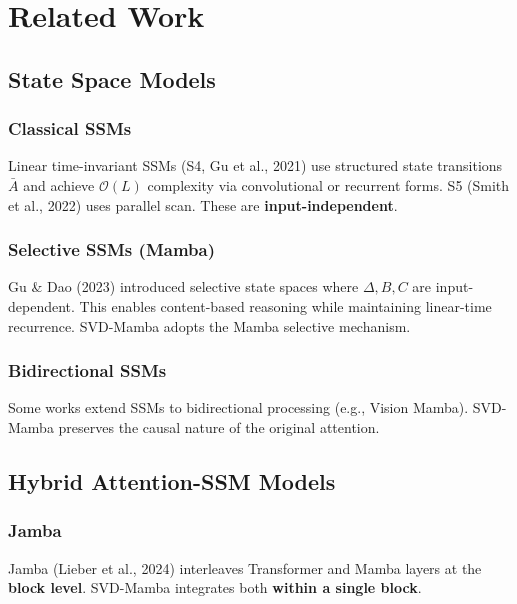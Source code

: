 
\section{Related Work}

\subsection{State Space Models}

\subsubsection{Classical SSMs}

Linear time-invariant SSMs (S4, Gu et al., 2021) use structured state 
transitions $\bar{A}$ and achieve $\mathcal{O}(L)$ complexity via 
convolutional or recurrent forms. S5 (Smith et al., 2022) uses parallel 
scan. These are \textbf{input-independent}.

\subsubsection{Selective SSMs (Mamba)}

Gu \& Dao (2023) introduced selective state spaces where $\Delta, B, C$ 
are input-dependent. This enables content-based reasoning while maintaining 
linear-time recurrence. SVD-Mamba adopts the Mamba selective mechanism.

\subsubsection{Bidirectional SSMs}

Some works extend SSMs to bidirectional processing (e.g., Vision Mamba). 
SVD-Mamba preserves the causal nature of the original attention.

\subsection{Hybrid Attention-SSM Models}

\subsubsection{Jamba}

Jamba (Lieber et al., 2024) interleaves Transformer and Mamba layers at 
the \textbf{block level}. SVD-Mamba integrates both \textbf{within a single block}.

